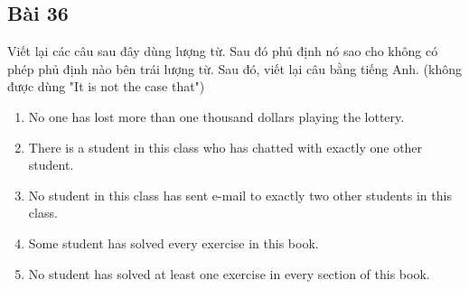 \subsection*{Bài 36}
Viết lại các câu sau đây dùng lượng từ. Sau đó phủ định nó sao cho không có phép phủ định nào bên trái lượng từ. Sau đó, viết lại câu bằng tiếng Anh. (không được dùng "It is not the case that")
\begin{enumerate}[label=\alph*)]
    \item No one has lost more than one thousand dollars playing the lottery.
    \item There is a student in this class who has chatted with exactly one other student.
    \item No student in this class has sent e-mail to exactly two other students in this class.
    \item Some student has solved every exercise in this book.
    \item No student has solved at least one exercise in every section of this book.
\end{enumerate}
